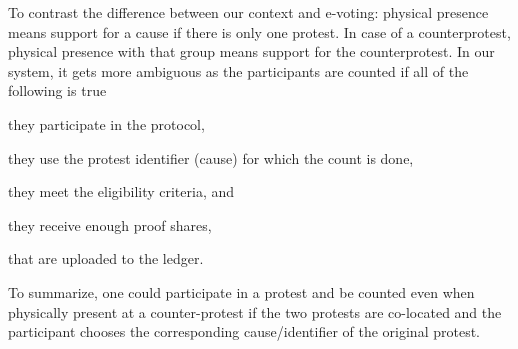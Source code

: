 To contrast the difference between our context and e-voting: physical presence means support for a cause if there is only one protest. 
In case of a counterprotest, physical presence with that group means support for the counterprotest. 
In our system, it gets more ambiguous as the participants are counted if all of the following is true
\begin{enumerate*}
\item they participate in the protocol,
\item they use the protest identifier (\ie cause) for which the count is done,
\item they meet the eligibility criteria, and
\item they receive enough proof shares,
\item that are uploaded to the ledger.
\end{enumerate*}
To summarize, one could participate in a protest and be counted even when physically present at a counter-protest if the two protests are co-located and the participant chooses the corresponding cause/identifier of the original protest.


